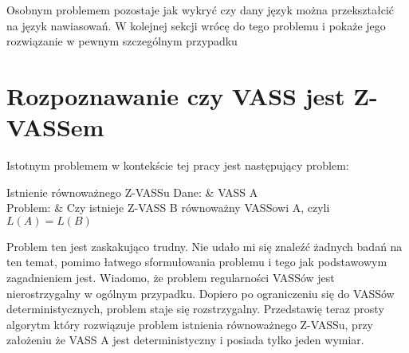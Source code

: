 \documentclass[magisterska]{pracamgr}
\begin{document}
    Osobnym problemem pozostaje jak wykryć czy dany język można przekształcić na język nawiasowań.
    W kolejnej sekcji wrócę do tego problemu i pokaże jego rozwiązanie w pewnym szczególnym przypadku


    \section{Rozpoznawanie czy VASS jest Z-VASSem}
    Istotnym problemem w kontekście tej pracy jest następujący problem:

    \begin{problem}[]{Istnienie równoważnego Z-VASSu}
        Dane: & VASS A\\
        Problem: & Czy istnieje Z-VASS B równoważny VASSowi A, czyli $L(A) = L(B)$ \\
    \end{problem}
    Problem ten jest zaskakująco trudny.
    Nie udało mi się znaleźć żadnych badań na ten temat, pomimo łatwego sformułowania problemu i tego jak podstawowym zagadnieniem jest.
    Wiadomo, że problem regularności VASSów jest nierostrzygalny w ogólnym przypadku\cite{regularity-checking}.
    Dopiero po ograniczeniu się do VASSów deterministycznych, problem staje się rozstrzygalny.
    Przedstawię teraz prosty algorytm który rozwiązuje problem istnienia równoważnego Z-VASSu, przy założeniu że VASS A
    jest deterministyczny i posiada tylko jeden wymiar.
\end{document}
